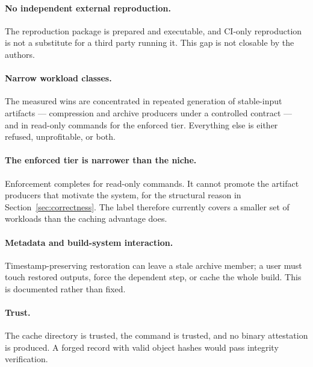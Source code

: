 \paragraph{No independent external reproduction.}
The reproduction package is prepared and executable, and CI-only reproduction is not a substitute
for a third party running it. This gap is not closable by the authors.

\paragraph{Narrow workload classes.}
The measured wins are concentrated in repeated generation of stable-input artifacts --- compression
and archive producers under a controlled contract --- and in read-only commands for the enforced
tier. Everything else is either refused, unprofitable, or both.

\paragraph{The enforced tier is narrower than the niche.}
Enforcement completes for read-only commands. It cannot promote the artifact producers that
motivate the system, for the structural reason in Section~\ref{sec:correctness}. The \proven{}
label therefore currently covers a smaller set of workloads than the caching advantage does.

\paragraph{Metadata and build-system interaction.}
Timestamp-preserving restoration can leave a stale archive member; a user must touch restored
outputs, force the dependent step, or cache the whole build. This is documented rather than fixed.

\paragraph{Trust.}
The cache directory is trusted, the command is trusted, and no binary attestation is produced. A
forged record with valid object hashes would pass integrity verification.
